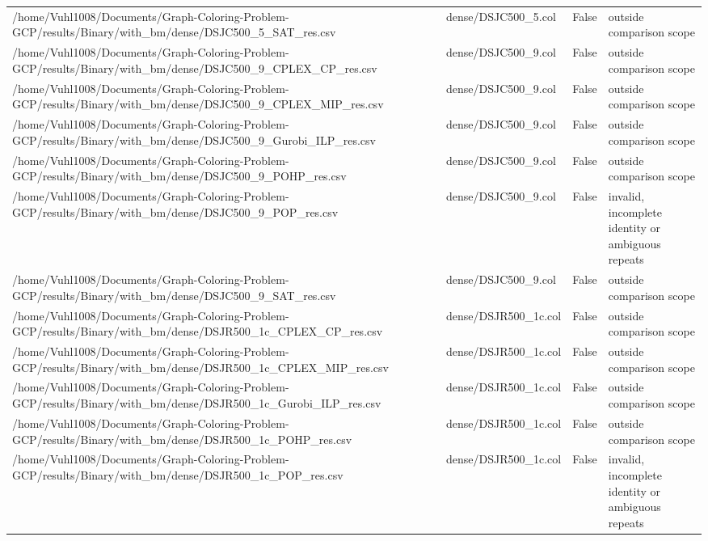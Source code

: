\begin{table}[htbp]
\begin{tabular}{llll}
/home/Vuhl1008/Documents/Graph-Coloring-Problem-GCP/results/Binary/with\_bm/dense/DSJC500\_5\_SAT\_res.csv & dense/DSJC500\_5.col & False & outside comparison scope \\
/home/Vuhl1008/Documents/Graph-Coloring-Problem-GCP/results/Binary/with\_bm/dense/DSJC500\_9\_CPLEX\_CP\_res.csv & dense/DSJC500\_9.col & False & outside comparison scope \\
/home/Vuhl1008/Documents/Graph-Coloring-Problem-GCP/results/Binary/with\_bm/dense/DSJC500\_9\_CPLEX\_MIP\_res.csv & dense/DSJC500\_9.col & False & outside comparison scope \\
/home/Vuhl1008/Documents/Graph-Coloring-Problem-GCP/results/Binary/with\_bm/dense/DSJC500\_9\_Gurobi\_ILP\_res.csv & dense/DSJC500\_9.col & False & outside comparison scope \\
/home/Vuhl1008/Documents/Graph-Coloring-Problem-GCP/results/Binary/with\_bm/dense/DSJC500\_9\_POHP\_res.csv & dense/DSJC500\_9.col & False & outside comparison scope \\
/home/Vuhl1008/Documents/Graph-Coloring-Problem-GCP/results/Binary/with\_bm/dense/DSJC500\_9\_POP\_res.csv & dense/DSJC500\_9.col & False & invalid, incomplete identity or ambiguous repeats \\
/home/Vuhl1008/Documents/Graph-Coloring-Problem-GCP/results/Binary/with\_bm/dense/DSJC500\_9\_SAT\_res.csv & dense/DSJC500\_9.col & False & outside comparison scope \\
/home/Vuhl1008/Documents/Graph-Coloring-Problem-GCP/results/Binary/with\_bm/dense/DSJR500\_1c\_CPLEX\_CP\_res.csv & dense/DSJR500\_1c.col & False & outside comparison scope \\
/home/Vuhl1008/Documents/Graph-Coloring-Problem-GCP/results/Binary/with\_bm/dense/DSJR500\_1c\_CPLEX\_MIP\_res.csv & dense/DSJR500\_1c.col & False & outside comparison scope \\
/home/Vuhl1008/Documents/Graph-Coloring-Problem-GCP/results/Binary/with\_bm/dense/DSJR500\_1c\_Gurobi\_ILP\_res.csv & dense/DSJR500\_1c.col & False & outside comparison scope \\
/home/Vuhl1008/Documents/Graph-Coloring-Problem-GCP/results/Binary/with\_bm/dense/DSJR500\_1c\_POHP\_res.csv & dense/DSJR500\_1c.col & False & outside comparison scope \\
/home/Vuhl1008/Documents/Graph-Coloring-Problem-GCP/results/Binary/with\_bm/dense/DSJR500\_1c\_POP\_res.csv & dense/DSJR500\_1c.col & False & invalid, incomplete identity or ambiguous repeats \\

\end{tabular}
\end{table}

